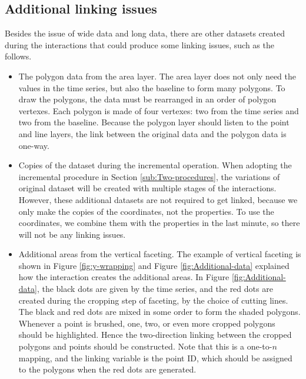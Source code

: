 \documentclass[12pt]{article}
\begin{document}
\subsection{Additional linking issues\label{sub:Linking-of-the-addition}}

Besides the issue of wide data and long data, there are other datasets
created during the interactions that could produce some linking issues,
such as the follows.
\begin{itemize} \itemsep 0in
\item The polygon data from the area layer. 
The area layer does not
only need the values in the time series, but also the baseline to
form many polygons. To draw the polygons, the data must be rearranged
in an order of polygon vertexes. Each polygon is made of four vertexes:
two from the time series and two from the baseline. Because the polygon
layer should listen to the point and line layers, the link between
the original data and the polygon data is one-way.

\item Copies of the dataset during the incremental operation.
When adopting the incremental procedure in Section 
\ref{sub:Two-procedures}, the variations of original dataset will
be created with multiple stages of the interactions. However, these
additional datasets are not required to get linked, because we only
make the copies of the coordinates, not the properties. To use the
coordinates, we combine them with the properties in the last minute,
so there will not be any linking issues.

\item Additional areas from the vertical faceting.
The example of vertical faceting is shown in Figure \ref{fig:y-wrapping}
and Figure \ref{fig:Additional-data} explained how the interaction
creates the additional areas. In Figure \ref{fig:Additional-data},
the black dots are given by the time series, and the red dots are
created during the cropping step of faceting, by the choice of
cutting lines. The black and red dots are mixed in some order to
form the shaded polygons. Whenever a point is brushed, one, two,
or even more cropped polygons should be highlighted. Hence the
two-direction linking between the cropped polygons and points
should be constructed. Note that this is a one-to-$n$ mapping,
and the linking variable is the point ID, which should be assigned
to the polygons when the red dots are generated.


\end{itemize}
\end{document}

